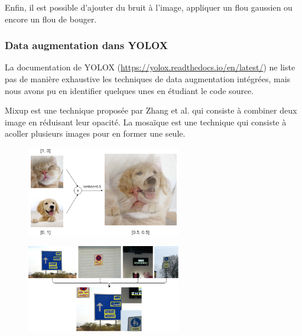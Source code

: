 Enfin, il est possible d'ajouter du bruit à l'image, appliquer un flou gaussien ou encore
un flou de bouger.

\subsubsection{Data augmentation dans YOLOX}

La documentation de YOLOX (\url{https://yolox.readthedocs.io/en/latest/}) ne liste pas de manière
exhaustive les techniques de data augmentation intégrées, mais nous avons pu en identifier quelques unes
en étudiant le code source.

Mixup est une technique proposée par Zhang et al. \cite{Zhang_Cisse_Dauphin_Lopez} qui consiste à combiner
deux image en réduisant leur opacité. La mosaïque est une technique qui consiste à
acoller plusieurs images pour en former une seule.

\begin{figure}[H]
    \centering
    \begin{minipage}{.5\textwidth}
      \centering
      \includegraphics[width=0.6\textwidth]{./img/mixup_augmentation.png}
      \label{fig:test1}
    \end{minipage}%
    \begin{minipage}{.5\textwidth}
      \centering
      \includegraphics[width=0.6\textwidth]{./img/mosaic_augmentation.png}
      \label{fig:test2}
    \end{minipage}
\end{figure}

